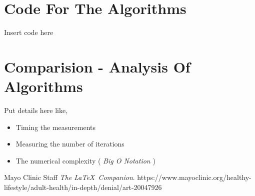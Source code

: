 \documentclass{article}
\begin{document}
    \section*{Code For The Algorithms}

        \begin{small}

            Insert code here

        \end{small}

    \section*{Comparision - Analysis Of Algorithms}

        Put details here like,

        \begin{itemize}
            \item Timing the measurements
            \item Measuring the number of iterations
            \item The numerical complexity ( \emph{Big O Notation} )
        \end{itemize}

    \begin{thebibliography}{9}
        Mayo Clinic Staff
        \textit{The \LaTeX\ Companion}.
        https://www.mayoclinic.org/healthy-lifestyle/adult-health/in-depth/denial/art-20047926
    \end{thebibliography}
\end{document}
